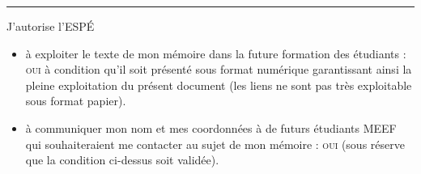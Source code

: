 \documentclass[french]{report}
\begin{document}
{\rule{\linewidth}{1mm}}\vspace{.7mm}

J'autorise l'ESP\'E
\begin{itemize}
\item à exploiter le texte de mon mémoire dans la future formation des
  étudiants : \textsc{oui} à condition qu'il soit présenté sous format
  numérique garantissant ainsi la pleine exploitation du présent
  document (les liens ne sont pas très exploitable sous format
  papier).
\item à communiquer mon nom et mes coordonnées à de futurs étudiants
  MEEF qui souhaiteraient me contacter au sujet de mon mémoire :
  \textsc{oui} (sous réserve que la condition ci-dessus soit validée).
\end{itemize}








\end{document}
